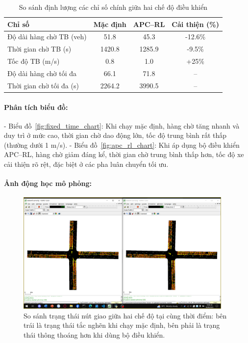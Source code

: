 \begin{table}[H]
\centering
\begin{tabular}{lccc}
\toprule
\textbf{Chỉ số} & \textbf{Mặc định} & \textbf{APC–RL} & \textbf{Cải thiện (\%)} \\
\midrule
Độ dài hàng chờ TB (veh)     & 51.8   & 45.3   & -12.6\% \\
Thời gian chờ TB (s)         & 1420.8 & 1285.9 & -9.5\% \\
Tốc độ TB (m/s)              & 0.8    & 1.0    & +25\%  \\
Độ dài hàng chờ tối đa       & 66.1   & 71.8   & --     \\
Thời gian chờ tối đa (s)      & 2264.2 & 3990.5 & --     \\
\bottomrule
\end{tabular}
\caption{So sánh định lượng các chỉ số chính giữa hai chế độ điều khiển}
\end{table}

\paragraph{Phân tích biểu đồ:}

- Biểu đồ~\ref{fig:fixed_time_chart}: Khi chạy mặc định, hàng chờ tăng nhanh và duy trì ở mức cao, thời gian chờ dao động lớn, tốc độ trung bình rất thấp (thường dưới 1 m/s).
- Biểu đồ~\ref{fig:apc_rl_chart}: Khi áp dụng bộ điều khiển APC–RL, hàng chờ giảm đáng kể, thời gian chờ trung bình thấp hơn, tốc độ xe cải thiện rõ rệt, đặc biệt ở các pha luân chuyển tối ưu.

\paragraph{Ảnh động học mô phỏng:}

\begin{figure}[H]
    \centering
    \includegraphics[width=0.95\textwidth]{Screenshot (765).png}
    \caption{So sánh trạng thái nút giao giữa hai chế độ tại cùng thời điểm: bên trái là trạng thái tắc nghẽn khi chạy mặc định, bên phải là trạng thái thông thoáng hơn khi dùng bộ điều khiển.}
    \label{fig:traffic_state_compare}
\end{figure}

